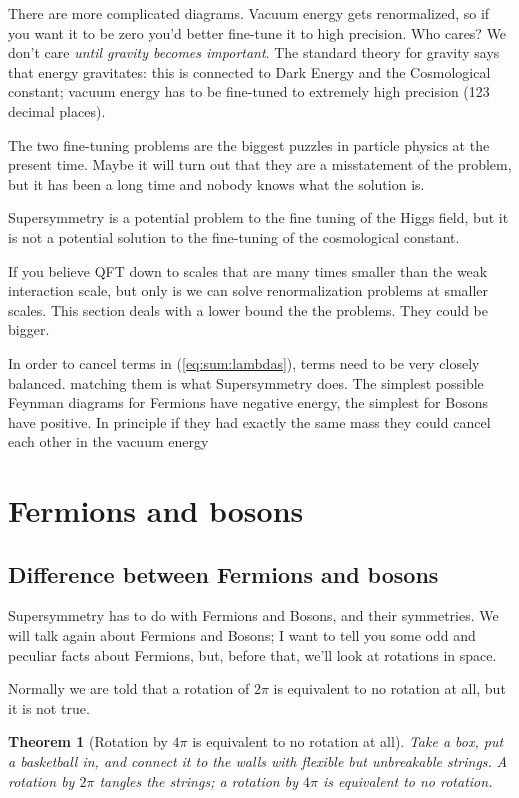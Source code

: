 \documentclass[]{article}
\newtheorem{thm}{Theorem}
\begin{document}
There are more complicated diagrams. Vacuum energy gets renormalized, so if you want it to be zero you'd better fine-tune it to high precision. Who cares? We don't care \emph{until gravity becomes important}. The standard theory for gravity says that energy gravitates: this is connected to Dark Energy and the Cosmological constant; vacuum energy has to be fine-tuned to extremely high precision (123 decimal places).

The two fine-tuning problems are the biggest puzzles in particle physics at the present time. Maybe it will turn out that they are a misstatement of the problem, but it has been a long time and nobody knows what the solution is.
 
Supersymmetry is a potential problem to the fine tuning of the Higgs field, but it is not a potential solution to the fine-tuning of the cosmological constant.

If you believe QFT down to scales that are many times smaller than the weak interaction scale, but only is we can solve renormalization problems at smaller scales. This section deals with a lower bound the the problems. They could be bigger.

In order to cancel terms in (\ref{eq:sum:lambdas}), terms need to be very closely balanced. matching them is what Supersymmetry does. The simplest possible Feynman diagrams for Fermions have negative energy, the simplest for Bosons have positive. In principle if they had exactly the same mass they could cancel each other in the vacuum energy
	
\section{Fermions and bosons}

\subsection{Difference between Fermions and bosons}
Supersymmetry has to do with Fermions and Bosons, and their symmetries. We will talk again about Fermions and Bosons; I want to tell you some odd and peculiar facts about Fermions, but, before that, we'll look at rotations in space.

Normally we are told that a rotation of $2\pi$ is equivalent to no rotation at all, but it is not true.

\begin{thm}[Rotation by $4\pi$ is equivalent to no rotation at all]
	Take a box, put a basketball in, and connect it to the walls with flexible but unbreakable strings. A rotation by $2\pi$ tangles the strings; a rotation by $4\pi$ is equivalent to no rotation.
\end{thm}
\end{document}
